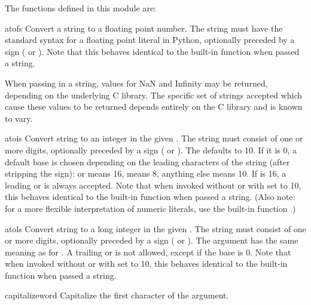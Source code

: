 The functions defined in this module are:


\begin{funcdesc}{atof}{s}
  Convert a string to a floating point number.  The string must have
  the standard syntax for a floating point literal in Python,
  optionally preceded by a sign (\samp{+} or \samp{-}).  Note that
  this behaves identical to the built-in function
   when passed a string.

   When passing in a string, values for NaN
  and Infinity may be returned, depending on the
  underlying C library.  The specific set of strings accepted which
  cause these values to be returned depends entirely on the C library
  and is known to vary.
\end{funcdesc}

\begin{funcdesc}{atoi}{s}
  Convert string  to an integer in the given .  The
  string must consist of one or more digits, optionally preceded by a
  sign (\samp{+} or \samp{-}).  The  defaults to 10.  If it
  is 0, a default base is chosen depending on the leading characters
  of the string (after stripping the sign):  or 
  means 16,  means 8, anything else means 10.  If 
  is 16, a leading  or  is always accepted.  Note
  that when invoked without  or with  set to 10,
  this behaves identical to the built-in function 
  when passed a string.  (Also note: for a more flexible
  interpretation of numeric literals, use the built-in function
  .)
\end{funcdesc}

\begin{funcdesc}{atol}{s}
  Convert string  to a long integer in the given .
  The string must consist of one or more digits, optionally preceded
  by a sign (\samp{+} or \samp{-}).  The  argument has the
  same meaning as for .  A trailing  or
   is not allowed, except if the base is 0.  Note that when
  invoked without  or with  set to 10, this
  behaves identical to the built-in function
   when passed a string.
\end{funcdesc}

\begin{funcdesc}{capitalize}{word}
  Capitalize the first character of the argument.
\end{funcdesc}

